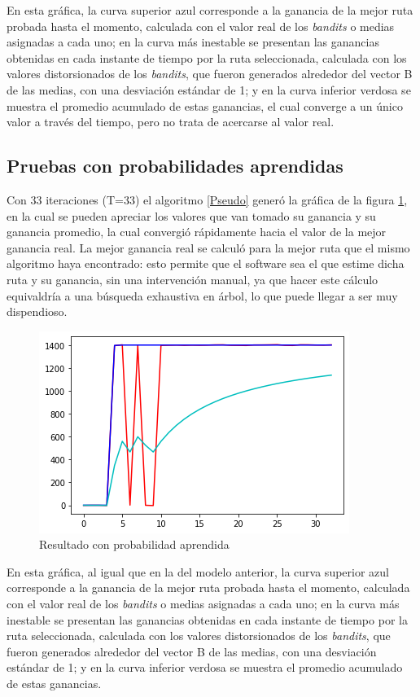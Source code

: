 En esta gráfica, la curva superior azul corresponde a la ganancia de la mejor ruta probada hasta el momento, calculada con el valor real de los \textit{bandits} o medias asignadas a cada uno; en la curva más inestable se presentan las ganancias obtenidas en cada instante de tiempo por la ruta seleccionada, calculada con los valores distorsionados de los \textit{bandits}, que fueron generados alrededor del vector B de las medias, con una desviación estándar de 1; y en la curva inferior verdosa se muestra el promedio acumulado de estas ganancias, el cual converge a un único valor a través del tiempo, pero no trata de acercarse al valor real.

\subsection{Pruebas con probabilidades aprendidas}

Con 33 iteraciones (T=33) el algoritmo \ref{Pseudo} generó la gráfica de la figura \ref{Resul2}, en la cual se pueden apreciar los valores que van tomado su ganancia y su ganancia promedio, la cual convergió rápidamente hacia el valor de la mejor ganancia real. La mejor ganancia real se calculó para la mejor ruta que el mismo algoritmo haya encontrado: esto permite que el software sea el que estime dicha ruta y su ganancia, sin una intervención manual, ya que hacer este cálculo equivaldría a una búsqueda exhaustiva en árbol, lo que puede llegar a ser muy dispendioso.

\begin{figure} [H]
	\centering
	\includegraphics[scale=1]{Resul2}
	\caption{Resultado con probabilidad aprendida}
	\label{Resul2}
\end{figure}

En esta gráfica, al igual que en la del modelo anterior, la curva superior azul corresponde a la ganancia de la mejor ruta probada hasta el momento, calculada con el valor real de los \textit{bandits} o medias asignadas a cada uno; en la curva más inestable se presentan las ganancias obtenidas en cada instante de tiempo por la ruta seleccionada, calculada con los valores distorsionados de los \textit{bandits}, que fueron generados alrededor del vector B de las medias, con una desviación estándar de 1; y en la curva inferior verdosa se muestra el promedio acumulado de estas ganancias. 

